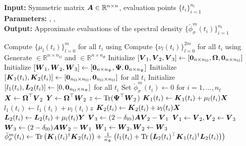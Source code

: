 \hspace*{\algorithmicindent} \textbf{Input:} Symmetric matrix $\boldsymbol{A} \in \mathbb{R}^{n \times n}$, evaluation points $\{t_i\}_{i=1}^{n_t}$ \\
\hspace*{\algorithmicindent} \textbf{Parameters:} , ,  \\
\hspace*{\algorithmicindent} \textbf{Output:} Approximate evaluations of the spectral density $\{\breve{\phi}_{\sigma}^m(t_i)\}_{i=1}^{n_t}$
\begin{algorithmic}[1]
    \State Compute $\{\mu_l(t_i)\}_{l=0}^m$ for all $t_i$ using 
    \State Compute $\{\nu_l(t_i)\}_{l=0}^{2m}$ for all $t_i$ using 
    \State Generate  $\in \mathbb{R}^{n \times n_{\Omega}}$ and  $\in \mathbb{R}^{n \times n_{\Psi}}$
    \State Initialize $[\boldsymbol{V}_1, \boldsymbol{V}_2, \boldsymbol{V}_3] \gets [\boldsymbol{0}_{n \times n_{\Omega}}, \boldsymbol{\boldsymbol{\Omega}}, \boldsymbol{0}_{n \times n_{\Omega}}]$
    \State Initialize $[\boldsymbol{W}_1, \boldsymbol{W}_2, \boldsymbol{W}_3] \gets [\boldsymbol{0}_{n \times n_{\Psi}}, \boldsymbol{\Psi}, \boldsymbol{0}_{n \times n_{\Psi}}]$
    \State Initialize $[\boldsymbol{K}_1(t_i), \boldsymbol{K}_2(t_i)] \gets [\boldsymbol{0}_{n_{\Omega} \times n_{\Omega}}, \boldsymbol{0}_{n_{\Omega} \times n_{\Omega}}]$ for all $t_i$
    \State Initialize $[l_1(t_i), \boldsymbol{L}_2(t_i)] \gets [0, \boldsymbol{0}_{n_{\Omega} \times n_{\Psi}}]$ for all $t_i$
    \State Set $\breve{\phi}_{\sigma}^m(t_i) \gets 0$ for $i=1,\dots,n_t$
      \State $\boldsymbol{X} \gets \boldsymbol{\boldsymbol{\Omega}}^{\top} \boldsymbol{V}_2$
      \State $\boldsymbol{Y} \gets \boldsymbol{\boldsymbol{\Omega}}^{\top} \boldsymbol{W}_2$
      \State $z \gets \operatorname{Tr}(\boldsymbol{\Psi}^{\top} \boldsymbol{W}_2$)
            \State $\boldsymbol{K}_1(t_i) \gets \boldsymbol{K}_1(t_i) + \mu_l(t_i) \boldsymbol{X}$
            \State $l_1(t_i) \gets l_1(t_i) + \nu_l(t_i) z$
        \EndIf
        \State $\boldsymbol{K}_2(t_i) \gets \boldsymbol{K}_2(t_i) + \nu_l(t_i) \boldsymbol{X}$
        \State $\boldsymbol{L}_2(t_i) \gets \boldsymbol{L}_2(t_i) + \mu_l(t_i) \boldsymbol{Y}$
      \EndFor
      \State $\boldsymbol{V}_3 \gets (2 - \delta_{l0}) \boldsymbol{A} \boldsymbol{V}_2 - \boldsymbol{V}_1$ 
      \State $\boldsymbol{V}_1 \gets \boldsymbol{V}_2, \boldsymbol{V}_2 \gets \boldsymbol{V}_3$
      \State $\boldsymbol{W}_3 \gets (2 - \delta_{l0}) \boldsymbol{A} \boldsymbol{W}_2 - \boldsymbol{W}_1$ 
      \State $\boldsymbol{W}_1 \gets \boldsymbol{W}_2, \boldsymbol{W}_2 \gets \boldsymbol{W}_3$
    \EndFor
      \State $\breve{\phi}_{\sigma}^m(t_i) \gets \operatorname{Tr}\left( \boldsymbol{K}_1(t_i)^{\dagger}\boldsymbol{K}_2(t_i) \right) + \frac{1}{n_{\Psi}} \left( l_1(t_i) + \operatorname{Tr}\left( \boldsymbol{L}_2(t_i)^{\top} \boldsymbol{K}_1(t_i)^{\dagger} \boldsymbol{L}_2(t_i) \right)  \right) $ \label{lin:4-nystromchebyshev-nystrom-pp}
    \EndFor
\end{algorithmic}
